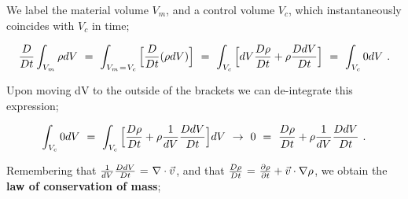 \documentclass{article}
\begin{document}
We label the material volume \begin{math} V_m \end{math}, and a control volume \begin{math} V_c \end{math}, which instantaneously coincides with \begin{math} V_c \end{math} in time;

\begin{equation} \label{eq:1}
\frac{D}{D t} \int_{V_m} \rho dV \hspace{0.125cm} = \hspace{0.125cm} \int_{V_m \hspace{0.025cm} = \hspace{0.025cm} V_c} \Big[ \frac{D}{D t} ( \rho dV ) \Big] \hspace{0.125cm} = \hspace{0.125cm} \int_{V_c} \Big[ dV \frac{D \rho}{D t} + \rho \frac{D dV}{D t} \Big] \hspace{0.125cm} = \hspace{0.125cm}  \int_{V_c} 0 dV \hspace{0.125cm}  . 
\end{equation} 

Upon moving dV to the outside of the brackets we can de-integrate this expression;

\begin{equation} \label{eq:1}
\int_{V_c} 0 dV \hspace{0.125cm} = \hspace{0.125cm} \int_{V_c} \Big[ \frac{D \rho}{D t} + \rho \frac{1}{dV} \frac{D dV}{D t} \Big] dV \hspace{0.125cm} \rightarrow \hspace{0.125cm} 0 \hspace{0.125cm} = \hspace{0.125cm} \frac{D \rho}{D t} + \rho \frac{1}{dV} \frac{D dV}{D t}  \hspace{0.125cm}  . 
\end{equation} 

Remembering that \begin{math} \frac{1}{dV} \frac{D dV}{D t} \hspace{0.025cm} = \hspace{0.025cm} \nabla \cdot \vec{v} \end{math}, and that \begin{math} \frac{D \rho}{D t} \hspace{0.025cm} = \hspace{0.025cm} \frac{\partial{\rho}}{\partial{t}} + \vec{v} \cdot \nabla{\rho} \end{math}, we obtain the \textbf{law of conservation of mass};
\end{document}
